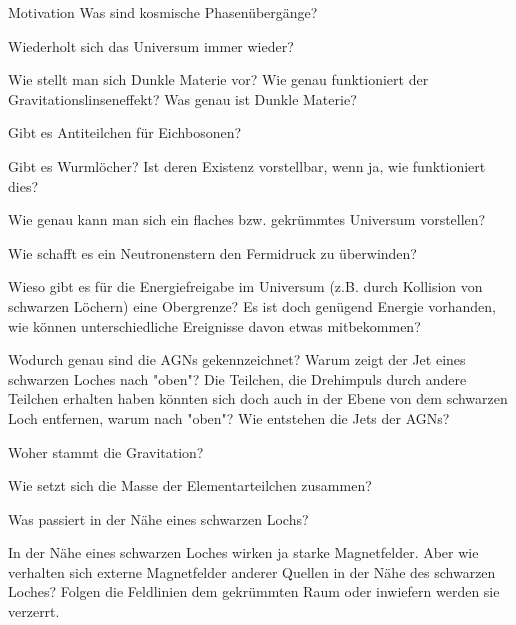 \begin{frame}{Motivation}
  Was sind kosmische Phasenübergänge?

  Wiederholt sich das Universum immer wieder?

  Wie stellt man sich Dunkle Materie vor?
  Wie genau funktioniert der Gravitationslinseneffekt?
  Was genau ist Dunkle Materie?

  Gibt es Antiteilchen für Eichbosonen?

  Gibt es Wurmlöcher? Ist deren Existenz vorstellbar, wenn ja, wie funktioniert dies?

  Wie genau kann man sich ein flaches bzw. gekrümmtes Universum vorstellen?

  Wie schafft es ein Neutronenstern den Fermidruck zu überwinden?

  Wieso gibt es für die Energiefreigabe im Universum (z.B. durch
  Kollision von schwarzen Löchern) eine Obergrenze? Es ist doch genügend
  Energie vorhanden, wie können unterschiedliche Ereignisse davon etwas
  mitbekommen?

  Wodurch genau sind die AGNs gekennzeichnet?
  Warum zeigt der Jet eines schwarzen Loches nach "oben"?
  Die Teilchen, die Drehimpuls durch andere Teilchen erhalten haben könnten
  sich doch auch in der Ebene von dem schwarzen Loch entfernen, warum nach
  "oben"?
  Wie entstehen die Jets der AGNs?

  Woher stammt die Gravitation?

  Wie setzt sich die Masse der Elementarteilchen zusammen?

  Was passiert in der Nähe eines schwarzen Lochs?

  In der Nähe eines schwarzen Loches wirken ja starke Magnetfelder. Aber
  wie verhalten sich externe Magnetfelder anderer Quellen in der Nähe des
  schwarzen Loches? Folgen die Feldlinien dem gekrümmten Raum oder inwiefern
  werden sie verzerrt.

\end{frame}
